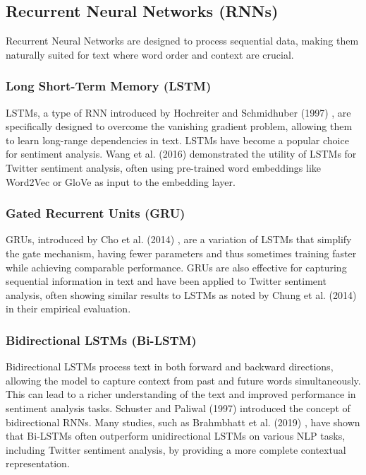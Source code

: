 \subsection{Recurrent Neural Networks (RNNs)}

Recurrent Neural Networks are designed to process sequential data, making them naturally suited for text where word order and context are crucial.

\subsubsection{Long Short-Term Memory (LSTM)}

LSTMs, a type of RNN introduced by Hochreiter and Schmidhuber (1997) \cite{hochreiter1997long}, are specifically designed to overcome the vanishing gradient problem, allowing them to learn long-range dependencies in text. LSTMs have become a popular choice for sentiment analysis. Wang et al. (2016) \cite{wang2016ataelstm} demonstrated the utility of LSTMs for Twitter sentiment analysis, often using pre-trained word embeddings like Word2Vec or GloVe as input to the embedding layer.

\subsubsection{Gated Recurrent Units (GRU)}

GRUs, introduced by Cho et al. (2014) \cite{cho2014learning}, are a variation of LSTMs that simplify the gate mechanism, having fewer parameters and thus sometimes training faster while achieving comparable performance. GRUs are also effective for capturing sequential information in text and have been applied to Twitter sentiment analysis, often showing similar results to LSTMs as noted by Chung et al. (2014) \cite{chung2014empirical} in their empirical evaluation.


\subsubsection{Bidirectional LSTMs (Bi-LSTM)
}

Bidirectional LSTMs process text in both forward and backward directions, allowing the model to capture context from past and future words simultaneously. This can lead to a richer understanding of the text and improved performance in sentiment analysis tasks. Schuster and Paliwal (1997) \cite{schuster1997bidirectional} introduced the concept of bidirectional RNNs. Many studies, such as Brahmbhatt et al. (2019) \cite{brahmbhatt2019comparative}, have shown that Bi-LSTMs often outperform unidirectional LSTMs on various NLP tasks, including Twitter sentiment analysis, by providing a more complete contextual representation.

